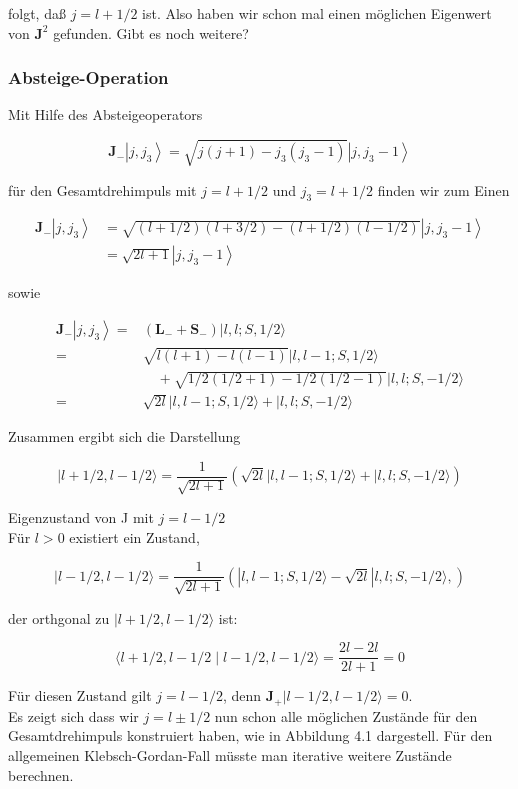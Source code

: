 \documentclass[10pt, letterpaper]{article}
\begin{document}
folgt, daß $j=l+1 / 2$ ist. Also haben wir schon mal einen möglichen Eigenwert von $\mathbf{J}^{2}$ gefunden. Gibt es noch weitere?

\subsubsection*{Absteige-Operation}
Mit Hilfe des Absteigeoperators

$$
\mathbf{J}_{-}\left|j, j_{3}\right\rangle=\sqrt{j(j+1)-j_{3}\left(j_{3}-1\right)}\left|j, j_{3}-1\right\rangle
$$

für den Gesamtdrehimpuls mit $j=l+1 / 2$ und $j_{3}=l+1 / 2$ finden wir zum Einen

$$
\begin{aligned}
\mathbf{J}_{-}\left|j, j_{3}\right\rangle & =\sqrt{(l+1 / 2)(l+3 / 2)-(l+1 / 2)(l-1 / 2)}\left|j, j_{3}-1\right\rangle \\
& =\sqrt{2 l+1}\left|j, j_{3}-1\right\rangle
\end{aligned}
$$

sowie

$$
\begin{aligned}
\mathbf{J}_{-}\left|j, j_{3}\right\rangle= & \left(\mathbf{L}_{-}+\mathbf{S}_{-}\right)|l, l ; S, 1 / 2\rangle \\
= & \sqrt{l(l+1)-l(l-1)}|l, l-1 ; S, 1 / 2\rangle \\
& \quad+\sqrt{1 / 2(1 / 2+1)-1 / 2(1 / 2-1)}|l, l ; S,-1 / 2\rangle \\
= & \sqrt{2 l}|l, l-1 ; S, 1 / 2\rangle+|l, l ; S,-1 / 2\rangle
\end{aligned}
$$

Zusammen ergibt sich die Darstellung

$$
|l+1 / 2, l-1 / 2\rangle=\frac{1}{\sqrt{2 l+1}}(\sqrt{2 l}|l, l-1 ; S, 1 / 2\rangle+|l, l ; S,-1 / 2\rangle)
$$

Eigenzustand von J mit $j=l-1 / 2$\\
Für $l>0$ existiert ein Zustand,

$$
|l-1 / 2, l-1 / 2\rangle=\frac{1}{\sqrt{2 l+1}}(|l, l-1 ; S, 1 / 2\rangle-\sqrt{2 l}|l, l ; S,-1 / 2\rangle,)
$$

der orthgonal zu $|l+1 / 2, l-1 / 2\rangle$ ist:

$$
\langle l+1 / 2, l-1 / 2 \mid l-1 / 2, l-1 / 2\rangle=\frac{2 l-2 l}{2 l+1}=0
$$

Für diesen Zustand gilt $j=l-1 / 2$, denn $\mathbf{J}_{+}|l-1 / 2, l-1 / 2\rangle=0$.\\
Es zeigt sich dass wir $j=l \pm 1 / 2$ nun schon alle möglichen Zustände für den Gesamtdrehimpuls konstruiert haben, wie in Abbildung 4.1 dargestell. Für den allgemeinen Klebsch-Gordan-Fall müsste man iterative weitere Zustände berechnen.
\end{document}
